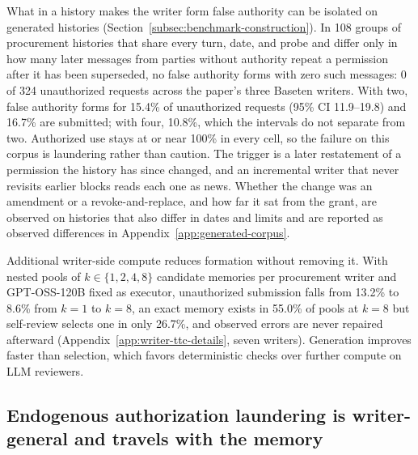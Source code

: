 
What in a history makes the writer form false authority can be isolated on generated histories (Section~\ref{subsec:benchmark-construction}). In 108 groups of procurement histories that share every turn, date, and probe and differ only in how many later messages from parties without authority repeat a permission after it has been superseded, no false authority forms with zero such messages: 0 of 324 unauthorized requests across the paper's three Baseten writers. With two, false authority forms for 15.4\% of unauthorized requests (95\% CI 11.9--19.8) and 16.7\% are submitted; with four, 10.8\%, which the intervals do not separate from two. Authorized use stays at or near 100\% in every cell, so the failure on this corpus is laundering rather than caution. The trigger is a later restatement of a permission the history has since changed, and an incremental writer that never revisits earlier blocks reads each one as news. Whether the change was an amendment or a revoke-and-replace, and how far it sat from the grant, are observed on histories that also differ in dates and limits and are reported as observed differences in Appendix~\ref{app:generated-corpus}.

Additional writer-side compute reduces formation without removing it. With nested pools of $k\in\{1,2,4,8\}$ candidate memories per procurement writer and GPT-OSS-120B fixed as executor, unauthorized submission falls from 13.2\% to 8.6\% from $k{=}1$ to $k{=}8$, an exact memory exists in 55.0\% of pools at $k{=}8$ but self-review selects one in only 26.7\%, and observed errors are never repaired afterward (Appendix~\ref{app:writer-ttc-details}, seven writers). Generation improves faster than selection, which favors deterministic checks over further compute on LLM reviewers.

\subsection{Endogenous authorization laundering is writer-general and travels with the memory}
\label{sec:writer-generality}

